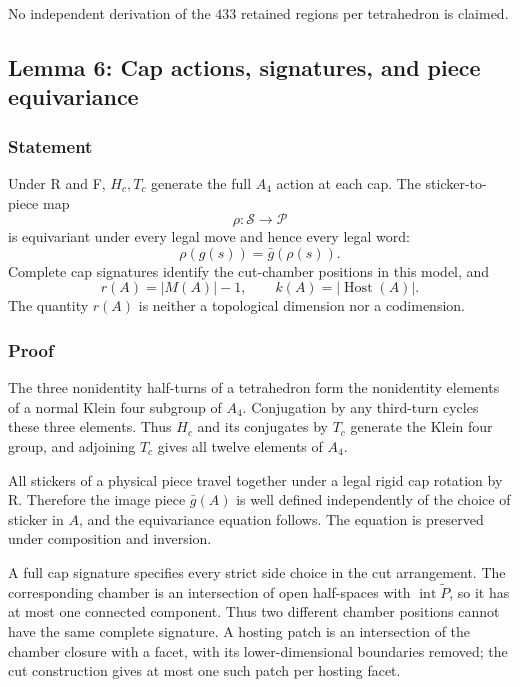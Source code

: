 \documentclass[
  10pt,
  a4paper,
]{article}
\begin{document}
No independent derivation of the \(433\) retained regions per
tetrahedron is claimed.

\subsection{Lemma 6: Cap actions, signatures, and piece
equivariance}\label{lemma-6-cap-actions-signatures-and-piece-equivariance}

\subsubsection{Statement}\label{statement-5}

Under R and F, \(H_c,T_c\) generate the full \(A_4\) action at each cap.
The sticker-to-piece map \begin{equation}
\rho:\mathcal S\longrightarrow\mathcal P
\end{equation} is equivariant under every legal move and hence every
legal word: \begin{equation}
\rho(g(s))=\bar g(\rho(s)).
\end{equation} Complete cap signatures identify the cut-chamber
positions in this model, and \begin{equation}
r(A)=|M(A)|-1,\qquad
k(A)=|\operatorname{Host}(A)|.
\end{equation} The quantity \(r(A)\) is neither a topological dimension
nor a codimension.

\subsubsection{Proof}\label{proof-5}

The three nonidentity half-turns of a tetrahedron form the nonidentity
elements of a normal Klein four subgroup of \(A_4\). Conjugation by any
third-turn cycles these three elements. Thus \(H_c\) and its conjugates
by \(T_c\) generate the Klein four group, and adjoining \(T_c\) gives
all twelve elements of \(A_4\).

All stickers of a physical piece travel together under a legal rigid cap
rotation by R. Therefore the image piece \(\bar g(A)\) is well defined
independently of the choice of sticker in \(A\), and the equivariance
equation follows. The equation is preserved under composition and
inversion.

A full cap signature specifies every strict side choice in the cut
arrangement. The corresponding chamber is an intersection of open
half-spaces with \(\operatorname{int}\widetilde P\), so it has at most
one connected component. Thus two different chamber positions cannot
have the same complete signature. A hosting patch is an intersection of
the chamber closure with a facet, with its lower-dimensional boundaries
removed; the cut construction gives at most one such patch per hosting
facet.
\end{document}
